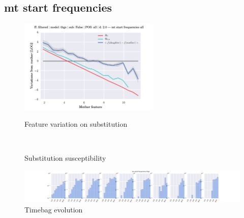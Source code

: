 \subsection{mt start frequencies}
\begin{figure}[h!]
    \centering
    \includegraphics[width=0.6\textwidth]{images/feature-cards/mt_start_frequencies/feature_variations.png}
    \caption{Feature variation on substitution}
	~
	\caption{Substitution susceptibility}
    \includegraphics[width=\textwidth]{images/feature-cards/mt_start_frequencies/timebags_evolution-hist.png}
	\caption{Timebag evolution}
\end{figure}


\clearpage
